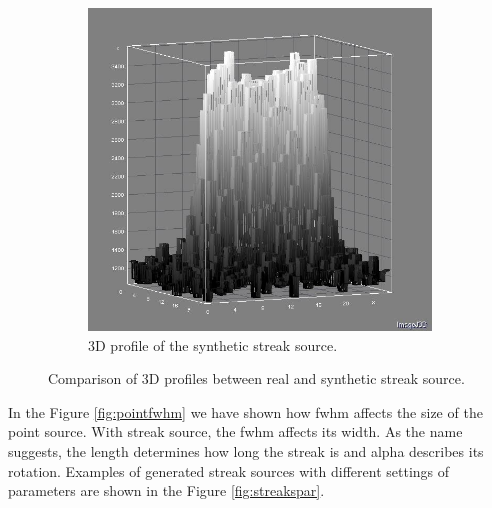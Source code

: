\begin{figure}[!h]
\begin{subfigure}[t]{.4\textwidth}
        \includegraphics[width=\textwidth]{images/synStreak3D.JPG}
        \caption{3D profile of the synthetic streak source.}
        \label{fig:streak3D2}
    \end{subfigure}

    \caption{Comparison of 3D profiles between real and synthetic streak source.}
    \label{fig:streak3D}
\end{figure}

In the Figure \ref{fig:pointfwhm} we have shown how fwhm affects the size of the point source. With streak source, the fwhm affects its width. As the name suggests, the length determines how long the streak is and alpha describes its rotation. Examples of generated streak sources with different settings of parameters are shown in the Figure \ref{fig:streakspar}. 

